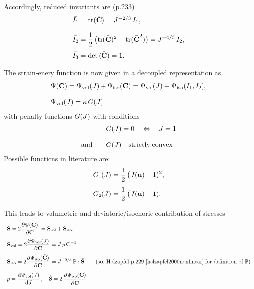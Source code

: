 Accordingly, reduced invariants are (p.233)
\begin{equation*}
  \begin{array}{lll}
    \bar{I_1} = \mathrm{tr}(\bar{\textbf{C}}) = J^{-2/3}\,I_1,\\[4mm]
    \bar{I_2} = \displaystyle\frac{\displaystyle{1}}{\displaystyle{2}}\,\big(\mathrm{tr}(\bar{\textbf{C}})^2 - \mathrm{tr}(\bar{\textbf{C}}^2)\big) = J^{-4/3}\,I_2,\\[4mm]
    \bar{I_3} = \hbox{det} \,(\bar{\textbf{C}}) = 1.
  \end{array}
\end{equation*}

The strain-enery function is now given in a decoupled representation as
\begin{equation*}
  \begin{array}{lll}
    \Psi(\textbf{C}) = \Psi_\text{vol}(J) + \Psi_\text{iso}(\bar{\textbf{C}}) = \Psi_\text{vol}(J) + \Psi_\text{iso}(\bar{I_1}, \bar{I_2}),\\[4mm]
    \Psi_\text{vol}(J) = \kappa\,G(J)
  \end{array}
\end{equation*}
with penalty functions $G(J)$ with conditions
\begin{equation*}
  \begin{array}{lll}
    & G(J) = 0 \quad\Leftrightarrow\quad J = 1\\[4mm]
    \text{and}\quad &G(J) \quad \text{strictly convex}
  \end{array}
\end{equation*}
Possible functions in literature are:
\begin{equation*}
  \begin{array}{lll}
    G_1(J) = \displaystyle\frac{\displaystyle{1}}{\displaystyle{2}}\,\big(J(\textbf{u}) - 1)^2,\\[4mm]
    G_2(J) = \displaystyle\frac{\displaystyle{1}}{\displaystyle{2}}\,\big(J(\textbf{u}) - 1).
  \end{array} 
\end{equation*}
 
This leads to volumetric and deviatoric/isochoric contribution of stresses
\begin{equation}\label{eq:stress_split}
  \begin{array}{lll}
    \bfS = 2\p{\Psi(\bfC)}{\bfC} = \bfS_\text{vol} + \bfS_\text{iso},\\[4mm]
    \bfS_\text{vol} = 2\p{\Psi_\text{vol}(J)}{\bfC} = J\,p\,\bfC^{-1}\\[4mm]
    \bfS_\text{iso} = 2\p{\Psi_\text{iso}(\bar{\bfC})}{\bfC} = J^{-2/3}\,\mathbb{P} : \bar{\bfS} \qquad \text{(see Holzapfel p.229 \cite{holzapfel2000nonlinear} for definition of $\mathbb{P}$)}\\[4mm]
    p = \d{\Psi_\text{vol}(J)}{J}, \quad \bar{\bfS} = 2\,\p{\Psi_\text{iso}(\bar{\bfC})}{\bar{\bfC}}
  \end{array}
\end{equation}

